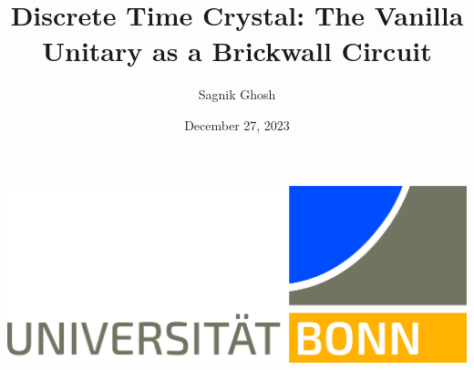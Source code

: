 \documentclass{amsproc}
\title{Discrete Time Crystal: The Vanilla Unitary as a Brickwall Circuit}                        %
\author{Sagnik Ghosh}
\date{December 27, 2023}            %
\begin{document}
\newtheorem{defn}[]{Definition}
\newtheorem{obs}[]{Observation}
\newtheorem{lem}[]{Lemma}
\newtheorem{thm}[]{Theorem}
\newtheorem{corr}[]{Corollary}
\newtheorem{conj}[]{Conjecture}
\newtheorem{prop}[]{Property}
\newtheorem{appr}[]{Approximation}
\newtheorem{claim}[]{Claim}
\newtheorem{notes}[]{Note}



\includegraphics[scale=0.03]{../.src/header/UNI_Bonn_Logo_Standard_RZ_Office.jpg}

\vspace{6mm}

\maketitle












%



\printbibliography
\end{document}
